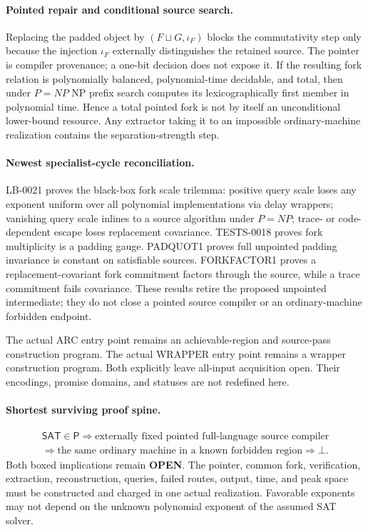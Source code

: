 \documentclass[11pt]{article}
\newcommand{\statusopen}{\textcolor{openstatus}{\textbf{OPEN}}}
\begin{document}
\paragraph{Pointed repair and conditional source search.}
Replacing the padded object by $(F\sqcup G,\iota_F)$ blocks the commutativity
step only because the injection $\iota_F$ externally distinguishes the
retained source. The pointer is compiler provenance; a one-bit decision does
not expose it. If the resulting fork relation is polynomially balanced,
polynomial-time decidable, and total, then under $P=NP$ NP prefix search
computes its lexicographically first member in polynomial time. Hence a total
pointed fork is not by itself an unconditional lower-bound resource. Any
extractor taking it to an impossible ordinary-machine realization contains
the separation-strength step.

\paragraph{Newest specialist-cycle reconciliation.}
LB-0021 proves the black-box fork scale trilemma: positive query scale loses
any exponent uniform over all polynomial implementations via delay wrappers;
vanishing query scale inlines to a source algorithm under $P=NP$; trace- or
code-dependent escape loses replacement covariance. TESTS-0018 proves fork
multiplicity is a padding gauge. PADQUOT1 proves full unpointed padding
invariance is constant on satisfiable sources. FORKFACTOR1 proves a
replacement-covariant fork commitment factors through the source, while a
trace commitment fails covariance. These results retire the proposed
unpointed intermediate; they do not close a pointed source compiler or an
ordinary-machine forbidden endpoint.

The actual ARC entry point  remains an achievable-region and
source-pass construction program. The actual WRAPPER entry point
 remains a wrapper construction program. Both explicitly
leave all-input acquisition open. Their encodings, promise domains, and
statuses are not redefined here.

\paragraph{Shortest surviving proof spine.}
\[
\begin{gathered}
\mathsf{SAT}\in\mathsf P
\Longrightarrow
\boxed{\text{externally fixed pointed full-language source compiler}}\\
\Longrightarrow
\boxed{\text{the same ordinary machine in a known forbidden region}}
\Longrightarrow\bot .
\end{gathered}
\]
Both boxed implications remain \statusopen. The pointer, common fork,
verification, extraction, reconstruction, queries, failed routes, output,
time, and peak space must be constructed and charged in one actual
realization. Favorable exponents may not depend on the unknown polynomial
exponent of the assumed SAT solver.
\end{document}

